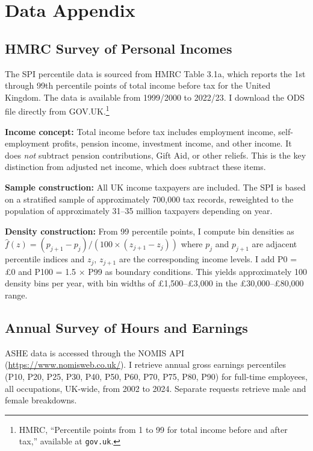 \documentclass[12pt]{article}
\begin{document}
\label{apep_main_text_end}
\newpage


\newpage
\appendix

\section{Data Appendix}
\label{sec:data_appendix}

\subsection{HMRC Survey of Personal Incomes}

The SPI percentile data is sourced from HMRC Table 3.1a, which reports the 1st through 99th percentile points of total income before tax for the United Kingdom. The data is available from 1999/2000 to 2022/23. I download the ODS file directly from GOV.UK.\footnote{HMRC, ``Percentile points from 1 to 99 for total income before and after tax,'' available at \texttt{gov.uk}.}

\textbf{Income concept:} Total income before tax includes employment income, self-employment profits, pension income, investment income, and other income. It does \emph{not} subtract pension contributions, Gift Aid, or other reliefs. This is the key distinction from adjusted net income, which does subtract these items.

\textbf{Sample construction:} All UK income taxpayers are included. The SPI is based on a stratified sample of approximately 700,000 tax records, reweighted to the population of approximately 31--35 million taxpayers depending on year.

\textbf{Density construction:} From 99 percentile points, I compute bin densities as $\hat{f}(z) = (p_{j+1} - p_j) / (100 \times (z_{j+1} - z_j))$ where $p_j$ and $p_{j+1}$ are adjacent percentile indices and $z_j$, $z_{j+1}$ are the corresponding income levels. I add P0 = \pounds0 and P100 = 1.5 $\times$ P99 as boundary conditions. This yields approximately 100 density bins per year, with bin widths of \pounds1,500--\pounds3,000 in the \pounds30,000--\pounds80,000 range.

\subsection{Annual Survey of Hours and Earnings}

ASHE data is accessed through the NOMIS API (\url{https://www.nomisweb.co.uk/}). I retrieve annual gross earnings percentiles (P10, P20, P25, P30, P40, P50, P60, P70, P75, P80, P90) for full-time employees, all occupations, UK-wide, from 2002 to 2024. Separate requests retrieve male and female breakdowns.
\end{document}
